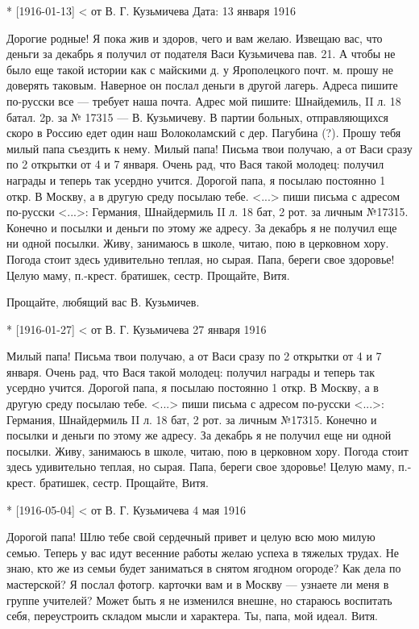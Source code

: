 * [1916-01-13] < от В. Г. Кузьмичева 
Дата: 13 января 1916

Дорогие родные! Я пока жив и здоров, чего и вам желаю. Извещаю вас, что деньги за декабрь я получил от подателя Васи Кузьмичева пав. 21. А чтобы не было еще такой истории как с майскими д. у Ярополецкого почт. м. прошу не доверять таковым. Наверное он послал деньги в другой лагерь. Адреса пишите по-русски все — требует наша почта. Адрес мой пишите: Шнайдемиль, II л. 18 батал. 2р. за № 17315 — В. Кузьмичеву. В партии больных, отправляющихся скоро в Россию едет один наш Волоколамский с дер. Пагубина (?). Прошу тебя милый папа съездить к нему. Милый папа! Письма твои получаю, а от Васи сразу по 2 открытки от 4 и 7 января. Очень рад, что Вася такой молодец: получил награды и теперь так усердно учится. Дорогой папа, я посылаю постоянно 1 откр. В Москву, а в другую среду посылаю тебе. <...> пиши письма с адресом по-русски <...>: Германия, Шнайдермиль II л. 18 бат, 2 рот. за личным №17315. Конечно и посылки и деньги по этому же адресу. За декабрь я не получил еще ни одной посылки. Живу, занимаюсь в школе, читаю, пою в церковном хору. Погода стоит здесь удивительно теплая, но сырая. Папа, береги свое здоровье! Целую маму, п.-крест. братишек, сестр. Прощайте, Витя.

Прощайте, любящий вас В. Кузьмичев.

* [1916-01-27] < от В. Г. Кузьмичева 
27 января 1916

Милый папа! Письма твои получаю, а от Васи сразу по 2 открытки от 4 и 7 января. Очень рад, что Вася такой молодец: получил награды и теперь так усердно учится. Дорогой папа, я посылаю постоянно 1 откр. В Москву, а в другую среду посылаю тебе. <...> пиши письма с адресом по-русски <...>: Германия, Шнайдермиль II л. 18 бат, 2 рот. за личным №17315. Конечно и посылки и деньги по этому же адресу. За декабрь я не получил еще ни одной посылки. Живу, занимаюсь в школе, читаю, пою в церковном хору. Погода стоит здесь удивительно теплая, но сырая. Папа, береги свое здоровье! Целую маму, п.-крест. братишек, сестр. Прощайте, Витя.

* [1916-05-04] < от В. Г. Кузьмичева 
4 мая 1916

Дорогой папа! Шлю тебе свой сердечный привет и целую всю мою милую семью. Теперь у вас идут весенние работы желаю успеха в тяжелых трудах. Не знаю, кто же из семьи будет заниматься в снятом ягодном огороде? Как дела по мастерской? Я послал фотогр. карточки вам и в Москву — узнаете ли меня в группе учителей? Может быть я не изменился внешне, но стараюсь воспитать себя, переустроить складом мысли и характера. Ты, папа, мой идеал. Витя.


